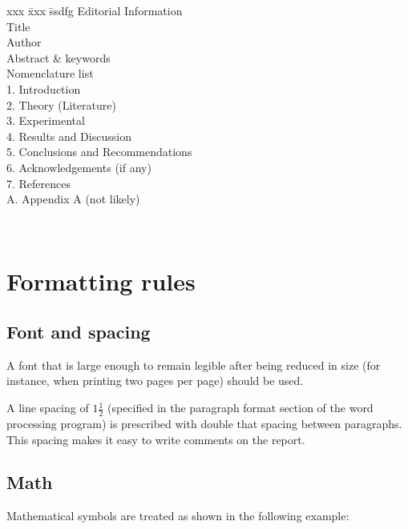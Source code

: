 \documentclass[a5paper, 10pt]{article}
\begin{document}
\begin{table}[htbp]
\begin{centering}
\begin{boxedminipage}[t]{0.4\textwidth}
\begin{spacing}{1.8}
    \begin{tabbing}
      xxx \= xxx \= ssdfg \kill
      Editorial Information                  \\
          \> Title                           \\
          \> Author                          \\         
          \> Abstract \& keywords            \\
          \> Nomenclature list               \\
      1.  \> Introduction                    \\
      2.  \> Theory (Literature)             \\
      3.  \> Experimental                    \\
      4.  \> Results and Discussion          \\
      5.  \> Conclusions and Recommendations \\
      6.  \> Acknowledgements  (if any)      \\
      7.  \> References                      \\
      A.  \> Appendix A  (not likely)        
    \end{tabbing}
  \end{spacing}
\end{boxedminipage}\\
\end{centering}
\end{table}

\section{Formatting rules}
\subsection{Font and spacing}
A font that is large enough to remain legible after being reduced in
size (for instance, when printing two pages per page) should be used.

A line spacing of $1\frac{1}{2}$ (specified in the 
paragraph format section of the word processing program) is prescribed
with double that spacing between paragraphs.  
This spacing makes it easy to write comments on the report.

\clearpage
\subsection{Math}
Mathematical symbols are treated as shown in the following example:
\end{document}

